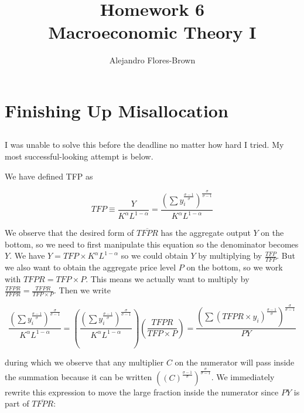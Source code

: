 \documentclass[12pt, letterpaper]{article}
\title{Homework 6 \\ Macroeconomic Theory I}
\author{Alejandro Flores-Brown}
\begin{document}
    \maketitle

    \section{Finishing Up Misallocation}

    \subsection{}

    I was unable to solve this before the deadline no matter how hard I tried. My most successful-looking attempt is below.

    We have defined TFP as 



    \[ TFP \equiv \frac{Y}{K^\alpha L^{1 - \alpha}} = \frac{\left( \sum y_i^{\frac{\sigma - 1}{\sigma}} \right)^{\frac{\sigma}{\sigma - 1}} }{K^\alpha L^{1 - \alpha}} \]

    We observe that the desired form of \(\overline{TFPR}\) has the aggregate output \(Y\) on the bottom, so we need to first manipulate this equation so the denominator becomes \(Y\). We have \(Y = TFP \times K^\alpha L^{1 - \alpha}\) so we could obtain \(Y\) by multiplying by \(\frac{TFP}{TFP}\). But we also want to obtain the aggregate price level \(P\) on the bottom, so we work with \(TFPR = TFP \times P\). This means we actually want to multiply by \(\frac{TFPR}{TFPR} = \frac{TFPR}{TFP \times P}\). Then we write

    \[ \frac{\left( \sum y_i^{\frac{\sigma - 1}{\sigma}} \right)^{\frac{\sigma}{\sigma - 1}} }{K^\alpha L^{1 - \alpha}} = \left( \frac{\left( \sum y_i^{\frac{\sigma - 1}{\sigma}} \right)^{\frac{\sigma}{\sigma - 1}} }{K^\alpha L^{1 - \alpha}} \right) \left( \frac{TFPR}{TFP \times P} \right) = \frac{\left( \sum \left(TFPR \times y_i\right)^{\frac{\sigma - 1}{\sigma}} \right)^{\frac{\sigma}{\sigma - 1}} }{P Y}     \]

    during which we observe that any multiplier \(C\) on the numerator will pass inside the summation because it can be written \( \left(\left(C\right)^{\frac{\sigma - 1}{\sigma}}\right)^{\frac{\sigma}{\sigma - 1}}\). We immediately rewrite this expression to move the large fraction inside the numerator since \(PY\) is part of \(\overline{TFPR}\):
\end{document}

